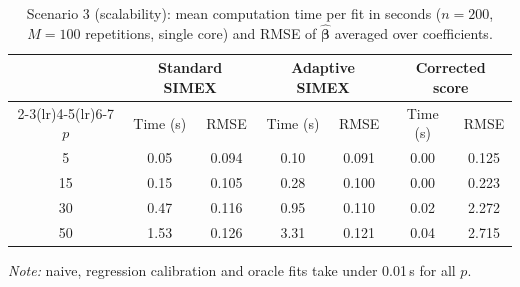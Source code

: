 \begin{table}[t]
\centering
\footnotesize
\caption{Scenario 3 (scalability): mean computation time per fit
in seconds ($n=200$, $M=100$ repetitions, single core) and RMSE
of $\hat{\bm\beta}$ averaged over coefficients.}
\label{tab:scenario3}
\begin{tabular}{c cc cc cc}
\toprule
& \multicolumn{2}{c}{Standard SIMEX} & \multicolumn{2}{c}{Adaptive SIMEX} & \multicolumn{2}{c}{Corrected score} \\
\cmidrule(lr){2-3}\cmidrule(lr){4-5}\cmidrule(lr){6-7}
$p$ & Time (s) & RMSE & Time (s) & RMSE & Time (s) & RMSE \\
\midrule
5 & 0.05 & 0.094 & 0.10 & 0.091 & 0.00 & 0.125 \\
15 & 0.15 & 0.105 & 0.28 & 0.100 & 0.00 & 0.223 \\
30 & 0.47 & 0.116 & 0.95 & 0.110 & 0.02 & 2.272 \\
50 & 1.53 & 0.126 & 3.31 & 0.121 & 0.04 & 2.715 \\
\bottomrule
\end{tabular}
\par\footnotesize \emph{Note:} naive, regression
calibration and oracle fits take under 0.01\,s for all $p$.
\end{table}